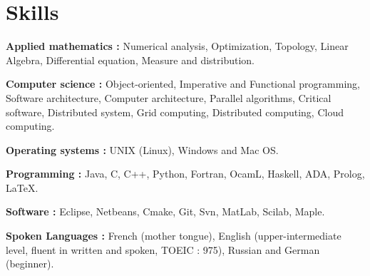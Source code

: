 \documentclass{article}
\renewenvironment{itemize}{
  \begin{list}{}{
      \setlength{\leftmargin}{1.5em}
      \setlength{\itemsep}{0.25em}
      \setlength{\parskip}{0pt}
      \setlength{\parsep}{0.25em}
    }
}{
  \end{list}
}
\begin{document}
\section*{Skills}
\begin{itemize}
	\item \textbf{Applied mathematics :} Numerical analysis, Optimization, Topology, Linear Algebra, Differential equation, Measure and distribution.
	\item \textbf{Computer science :} Object-oriented, Imperative and Functional programming, Software architecture, Computer architecture, Parallel algorithms, Critical software, Distributed system, Grid computing, Distributed computing, Cloud computing.
	\item \textbf{Operating systems :} UNIX (Linux), Windows and Mac OS.
	\item \textbf{Programming :} Java, C, C++, Python, Fortran, OcamL, Haskell, ADA, Prolog, \LaTeX. 
	\item \textbf{Software :} Eclipse, Netbeans, Cmake, Git, Svn, MatLab, Scilab, Maple.
	\item \textbf{Spoken Languages :} French (mother tongue), English (upper-intermediate level, fluent in written and spoken, TOEIC : 975), Russian and German (beginner).
\end{itemize}  
\end{document}
